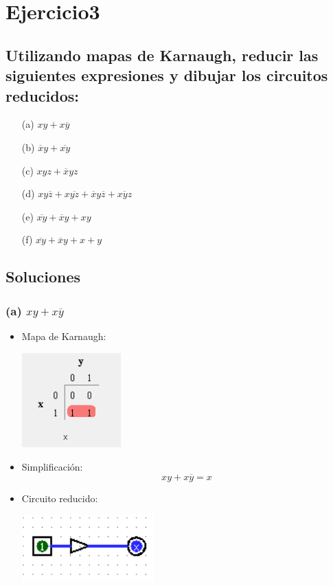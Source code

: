 \chapter*{Ejercicio3}

\section*{Utilizando mapas de Karnaugh, reducir las siguientes expresiones y dibujar los circuitos reducidos:}


\begin{enumerate}
    \item[(a)] $xy + x\overline{y}$
    \item[(b)] $\overline{x}y + \overline{xy}$
    \item[(c)] $xyz + \overline{x}yz$
    \item[(d)] $xy\overline{z} + x\overline{yz} + \overline{x}y\overline{z} + \overline{xyz}$
    \item[(e)] $\overline{xy} + \overline{x}y + xy$
    \item[(f)] $\overline{xy} + \overline{x}y + x + y$
\end{enumerate}

\section*{Soluciones}

\subsection*{(a) $xy + x\overline{y}$}

\begin{itemize}
    \item Mapa de Karnaugh:
\begin{center}
    \includegraphics[width=0.3\textwidth]{recursos/Ejercicio3/mapas/mapa_a).png}
\end{center}

    \item Simplificación: \[ xy + x\overline{y} = x \]

    \item Circuito reducido:
\begin{center}
    \includegraphics[width=0.4\textwidth]{recursos/Ejercicio3/circuito/circuito_a).png}
\end{center}
\end{itemize}

